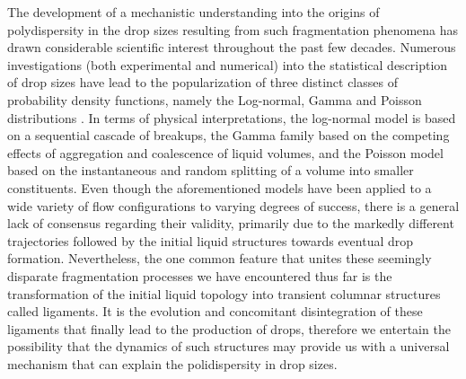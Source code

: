 The development of a mechanistic understanding into the origins of polydispersity in the drop sizes  
resulting from such fragmentation phenomena has drawn considerable scientific interest throughout the past few decades.
Numerous investigations (both experimental and numerical) into the statistical description of drop sizes
have lead to the popularization of three distinct classes of probability density functions, 
namely the Log-normal, Gamma and Poisson distributions \cite{vill_1}.  
In terms of physical interpretations, the log-normal model \cite{log_normal} is based on a sequential cascade
of breakups, the Gamma family \cite{vill_2} based on the competing effects of aggregation and coalescence of liquid volumes, 
and the Poisson model \cite{poisson} based on the instantaneous and random splitting of a volume into smaller constituents.  
Even though the aforementioned models have been applied to a wide variety of flow configurations
to varying degrees of success, there is a general lack of consensus regarding their validity, primarily 
due to the markedly different trajectories  
followed by the initial liquid structures towards eventual drop formation. 
Nevertheless, the one common feature that unites these seemingly disparate 
fragmentation processes we have encountered thus far is the transformation 
of the initial liquid topology into transient columnar structures called ligaments. 
It is the evolution and concomitant disintegration of these ligaments 
that finally lead to the production of drops, therefore we entertain 
the possibility that the dynamics of such structures may provide us with 
a universal mechanism that can explain the polidispersity in drop sizes. 


